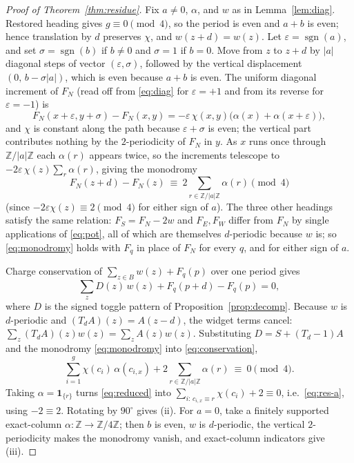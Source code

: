 \documentclass[11pt,reqno]{amsart}
\theoremstyle{plain}
\theoremstyle{definition}
\newcommand{\Z}{\mathbb{Z}}
\newcommand{\che}{\chi}
\newcommand{\drift}{d}
\newcommand{\growth}{g}
\begin{document}
\begin{proof}[Proof of Theorem~\ref{thm:residue}]
Fix $a\neq0$, $\alpha$, and $w$ as in Lemma~\ref{lem:diag}. Restored heading gives
$\growth\equiv0\pmod4$, so the period is even and $a+b$ is even; hence translation by
$\drift$ preserves $\che$, and $w(z+\drift)=w(z)$. Let $\varepsilon=\operatorname{sgn}(a)$,
and set $\sigma=\operatorname{sgn}(b)$ if $b\neq0$ and $\sigma=1$ if $b=0$. Move from
$z$ to $z+\drift$ by $|a|$ diagonal steps of vector $(\varepsilon,\sigma)$, followed by
the vertical displacement $(0,\,b-\sigma|a|)$, which is even because $a+b$ is even. The
uniform diagonal increment of $F_N$ (read off from \eqref{eq:diag} for
$\varepsilon=+1$ and from its reverse for $\varepsilon=-1$) is
\begin{equation}\label{eq:uniform}
F_N(x+\varepsilon,y+\sigma)-F_N(x,y)=-\varepsilon\,\che(x,y)\bigl(\alpha(x)+\alpha(x+\varepsilon)\bigr),
\end{equation}
and $\che$ is constant along the path because $\varepsilon+\sigma$ is even; the
vertical part contributes nothing by the $2$-periodicity of $F_N$ in $y$. As $x$ runs
once through $\Z/|a|\Z$ each $\alpha(r)$ appears twice, so the increments telescope to
$-2\varepsilon\,\che(z)\sum_{r}\alpha(r)$, giving the monodromy
\begin{equation}\label{eq:monodromy}
F_N(z+\drift)-F_N(z)\ \equiv\ 2\sum_{r\in\Z/|a|\Z}\alpha(r)\pmod4
\end{equation}
(since $-2\varepsilon\che(z)\equiv2\pmod4$ for either sign of $a$). The three other headings satisfy the same relation: $F_S=F_N-2w$
and $F_E,F_W$ differ from $F_N$ by single applications of \eqref{eq:pot}, all of which
are themselves $\drift$-periodic because $w$ is; so \eqref{eq:monodromy} holds with
$F_q$ in place of $F_N$ for every $q$, and for either sign of $a$.

Charge conservation of $\sum_{z\in B}w(z)+F_q(p)$ over one period gives
\begin{equation}\label{eq:conservation}
\sum_{z}D(z)\,w(z)+F_q(p+\drift)-F_q(p)=0,
\end{equation}
where $D$ is the signed toggle pattern of Proposition~\ref{prop:decomp}. Because $w$
is $\drift$-periodic and $(T_\drift A)(z)=A(z-\drift)$, the widget terms cancel:
$\sum_z(T_\drift A)(z)w(z)=\sum_zA(z)w(z)$. Substituting $D=S+(T_\drift-1)A$ and the
monodromy \eqref{eq:monodromy} into \eqref{eq:conservation},
\begin{equation}\label{eq:reduced}
\sum_{i=1}^{\growth}\che(c_i)\,\alpha(c_{i,x})+2\sum_{r\in\Z/|a|\Z}\alpha(r)\ \equiv\ 0\pmod4 .
\end{equation}
Taking $\alpha=\mathbf 1_{\{r\}}$ turns \eqref{eq:reduced} into
$\sum_{i:\,c_{i,x}\equiv r}\che(c_i)+2\equiv0$, i.e.\ \eqref{eq:res-a}, using
$-2\equiv2$. Rotating by $90^\circ$ gives (ii). For $a=0$, take a finitely supported
exact-column $\alpha:\Z\to\Z/4\Z$; then $b$ is even, $w$ is $\drift$-periodic, the
vertical $2$-periodicity makes the monodromy vanish, and exact-column indicators give
(iii).
\end{proof}
\end{document}
